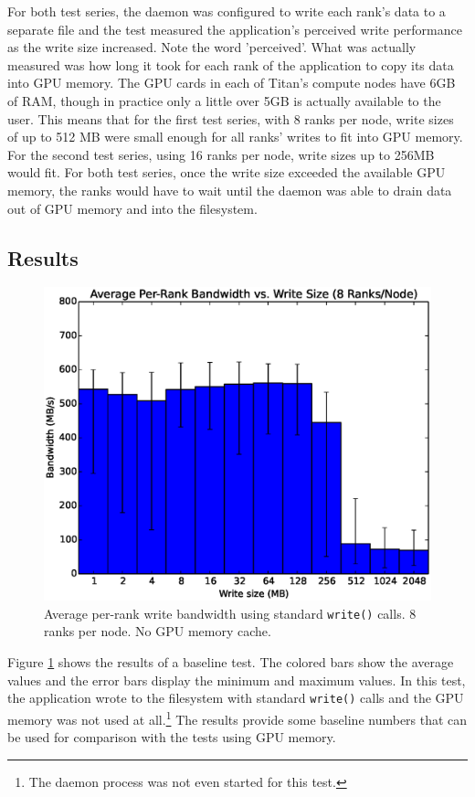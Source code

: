 For both test series, the daemon was configured to write each rank's data to a separate file and the test measured the application's perceived write performance as the write size increased.  Note the word 'perceived'.  What was actually measured was how long it took for each rank of the application to copy its data into GPU memory.   The GPU cards in each of Titan's compute nodes have 6GB of RAM, though in practice only a little over 5GB is actually available to the user.  This means that for the first test series, with 8 ranks per node, write sizes of up to 512 MB were small enough for all ranks' writes to fit into GPU memory.  For the second test series, using 16 ranks per node, write sizes up to 256MB would fit.  For both test series, once the write size exceeded the available GPU memory, the ranks would have to wait until the daemon was able to drain data out of GPU memory and into the filesystem.


\subsection{Results}
\label{subsec:results}

\begin{figure}
\includegraphics[width=\linewidth]{figures/figure_1.eps}
\caption{Average per-rank write bandwidth using standard \texttt{write()} calls.  8 ranks per node. No GPU memory cache.} 
\label{fig:results_base_8}
\end{figure}

Figure \ref{fig:results_base_8} shows the results of a baseline test.  The colored bars show the average values and the error bars display the minimum and maximum values.  In this test, the application wrote to the filesystem with standard \texttt{write()} calls and the GPU memory was not used at all.\footnote{The daemon process was not even started for this test.}  The results provide some baseline numbers that can be used for comparison with the tests using GPU memory.

